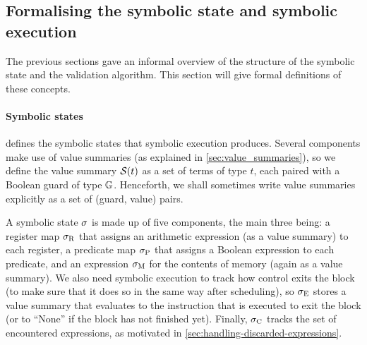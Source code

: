 {\subsection{Formalising the symbolic state and symbolic execution}
\label{sec:algorithm-symbolic-execution}

The previous sections gave an informal overview of the structure of the symbolic
state and the validation algorithm.  This section will give formal definitions
of these concepts.

\paragraph{Symbolic states}
 defines the symbolic states that symbolic
execution produces. Several components make use of value summaries (as explained
in \cref{sec:value_summaries}), so we define the value summary $\mathcal{S}(t)$
as a set of terms of type $t$, each paired with a Boolean guard of type
$\mathbb{G}$. Henceforth, we shall sometimes write value summaries explicitly as
a set of (guard, value) pairs.

A symbolic state $\sigma$ is made up of five components, the main three
being: a register map $\sigma_{\mathrm{R}}$ that assigns an arithmetic
expression (as a value summary) to each register, a predicate map
$\sigma_{\mathrm{P}}$ that assigns a Boolean expression to each
predicate, and an expression $\sigma_{\mathrm{M}}$ for the contents of memory
(again as a value summary).  We also need symbolic execution to track how
control exits the block (to make sure that it does so in the same way after
scheduling), so $\sigma_{\mathrm{E}}$ stores a value summary that evaluates
to the instruction that is executed to exit the block (or to \enquote{None} if
the block has not finished yet). Finally, $\sigma_{\mathrm{C}}$ tracks the
set of encountered expressions, as motivated in
\cref{sec:handling-discarded-expressions}.

}
